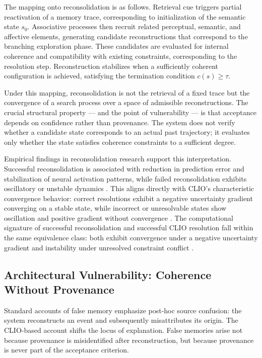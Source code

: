 \documentclass[12pt, a4paper]{article}
\begin{document}
The mapping onto reconsolidation is as follows. Retrieval cue triggers partial reactivation of a memory trace, corresponding to initialization of the semantic state $s_0$. Associative processes then recruit related perceptual, semantic, and affective elements, generating candidate reconstructions that correspond to the branching exploration phase. These candidates are evaluated for internal coherence and compatibility with existing constraints, corresponding to the resolution step. Reconstruction stabilizes when a sufficiently coherent configuration is achieved, satisfying the termination condition $c(s) \geq \tau$.

Under this mapping, reconsolidation is not the retrieval of a fixed trace but the convergence of a search process over a space of admissible reconstructions. The crucial structural property --- and the point of vulnerability --- is that acceptance depends on confidence rather than provenance. The system does not verify whether a candidate state corresponds to an actual past trajectory; it evaluates only whether the state satisfies coherence constraints to a sufficient degree.

Empirical findings in reconsolidation research support this interpretation. Successful reconsolidation is associated with reduction in prediction error and stabilization of neural activation patterns, while failed reconsolidation exhibits oscillatory or unstable dynamics \cite{nader2000, hardt2010}. This aligns directly with CLIO's characteristic convergence behavior: correct resolutions exhibit a negative uncertainty gradient converging on a stable state, while incorrect or unresolvable states show oscillation and positive gradient without convergence \cite{cheng2025}. The computational signature of successful reconsolidation and successful CLIO resolution fall within the same equivalence class: both exhibit convergence under a negative uncertainty gradient and instability under unresolved constraint conflict \cite{cheng2025}.

\subsection{Architectural Vulnerability: Coherence Without Provenance}

Standard accounts of false memory emphasize post-hoc source confusion: the system reconstructs an event and subsequently misattributes its origin. The CLIO-based account shifts the locus of explanation. False memories arise not because provenance is misidentified after reconstruction, but because provenance is never part of the acceptance criterion.
\end{document}
